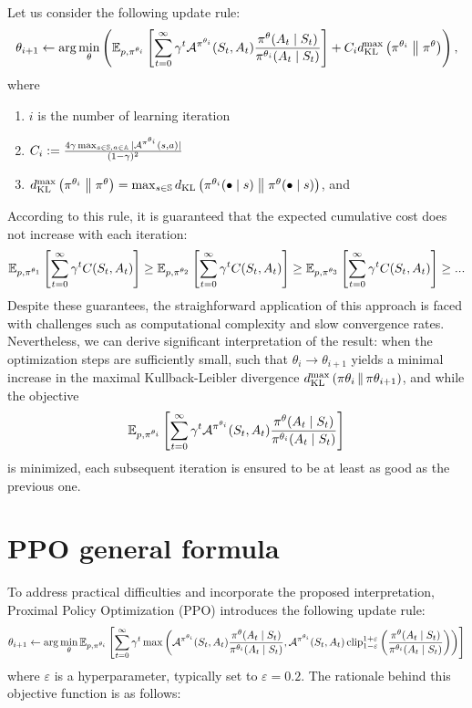 \documentclass[12pt,twoside]{../../mitthesis}
\begin{document}
Let us consider the following update rule:
$$
    \theta_{i + 1} \la \arg\min_{\theta} \left( \E[\transit, \policy^{\theta_i}]{\sum_{t=0}^{\infty} \gamma ^ t \Advan^{\policy^{\theta_i}}(\State_t, \Action_t)   \frac{\policy^{\theta}(\Action_t \mid \State_t)}{\policy^{\theta_i}(\Action_t \mid \State_t)}} + C_i d_{\text{KL}}^{\max}\left(\policy^{\theta_i}\;\middle\|\;\policy^{\theta}\right) \right), 
$$
where 
\begin{enumerate}
    \item $i$ is the number of learning iteration
    \item $C_i := \frac{4 \gamma\max_{s \in \states, a \in \actions}|\Advan^{\policy^{\theta_i}}(s, a)|}{(1 - \gamma)^2}$
    \item $d_{\text{KL}}^{\max}\left(\policy^{\theta_i}\;\middle\|\;\policy^{\theta}\right)  = \max_{\state \in \states}\kldiv{\policy^{\theta_i}(\bullet \mid s)}{\policy^{\theta}(\bullet \mid s)}$, and 
\end{enumerate}
According to this rule, it is guaranteed that the expected cumulative cost does not increase with each iteration:
$$
\E[\transit, \policy^{\theta_1}]{\sum_{t = 0}^{\infty} \gamma ^ t \Cost(\State_{t}, \Action_{t})} \geq \E[\transit, \policy^{\theta_2}]{\sum_{t = 0}^{\infty} \gamma ^ t \Cost(\State_{t}, \Action_{t})} \geq \E[\transit, \policy^{\theta_3}]{\sum_{t = 0}^{\infty} \gamma ^ t \Cost(\State_{t}, \Action_{t})} \geq ...
$$
Despite these guarantees, the straighforward application of this approach is faced with challenges such as computational complexity and slow convergence rates.
Nevertheless, we can derive significant interpretation of the result: when the optimization steps are sufficiently small, such that $\theta_i \rightarrow \theta_{i+1}$ yields a minimal increase in the maximal Kullback-Leibler divergence $d_{\text{KL}}^{\max}\left(\policy{\theta_i} \,\middle\|\, \policy{\theta_{i + 1}}\right)$, and while the objective 
\[
    \E[\transit, \policy^{\theta_i}]{\sum_{t=0}^{\infty} \gamma ^ t \Advan^{\policy^{\theta_i}}(\State_t, \Action_t)   \frac{\policy^{\theta}(\Action_t \mid \State_t)}{\policy^{\theta_i}(\Action_t \mid \State_t)}}
\]
is minimized, each subsequent iteration is ensured to be at least as good as the previous one.
\section*{PPO general formula}
To address practical difficulties and incorporate the proposed interpretation, Proximal Policy Optimization (PPO) introduces the following update rule:
\begin{equation}
    \theta_{i+1} \la \arg\min_{\theta}\E[\transit, \policy^{\theta_i}]{\sum_{t=0}^{\infty} \gamma ^ t \max\left(\Advan^{\policy^{\theta_i}}(\State_t, \Action_t)   \frac{\policy^{\theta}(\Action_t \mid \State_t)}{\policy^{\theta_i}(\Action_t \mid \State_t)}, \Advan^{\policy^{\theta_i}}(\State_t, \Action_t) \operatorname{clip}_{1 - \varepsilon}^{1 + \varepsilon}\left(\frac{\policy^{\theta}(\Action_t \mid \State_t)}{\policy^{\theta_i}(\Action_t \mid \State_t)}\right) \right)}
\end{equation}
where $\varepsilon$ is a hyperparameter, typically set to $\varepsilon = 0.2$. The rationale behind this objective function is as follows:
\end{document}
